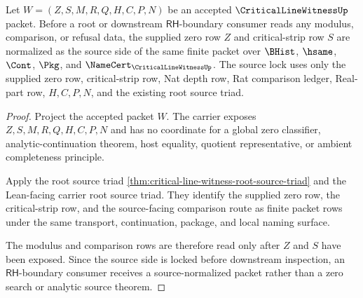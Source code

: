\begin{theorem}
\label{thm:critical-line-witness-source-normalization-lock}
Let $W=(Z,S,M,R,Q,H,C,P,N)$ be an accepted $\CriticalLineWitnessUp$ packet. Before a root or downstream $\mathsf{RH}$-boundary consumer reads any modulus, comparison, or refusal data, the supplied zero row $Z$ and critical-strip row $S$ are normalized as the source side of the same finite packet over $\BHist$, $\hsame$, $\Cont$, $\Pkg$, and $\NameCert_{\CriticalLineWitnessUp}$. The source lock uses only the supplied zero row, critical-strip row, Nat depth row, Rat comparison ledger, Real-part row, $H,C,P,N$, and the existing root source triad.
\end{theorem}
\begin{proof}
Project the accepted packet $W$. The carrier exposes $Z,S,M,R,Q,H,C,P,N$ and has no coordinate for a global zero classifier, analytic-continuation theorem, host equality, quotient representative, or ambient completeness principle.

Apply the root source triad \autoref{thm:critical-line-witness-root-source-triad} and the Lean-facing carrier root source triad. They identify the supplied zero row, the critical-strip row, and the source-facing comparison route as finite packet rows under the same transport, continuation, package, and local naming surface.

The modulus and comparison rows are therefore read only after $Z$ and $S$ have been exposed. Since the source side is locked before downstream inspection, an $\mathsf{RH}$-boundary consumer receives a source-normalized packet rather than a zero search or analytic source theorem.
\end{proof}

